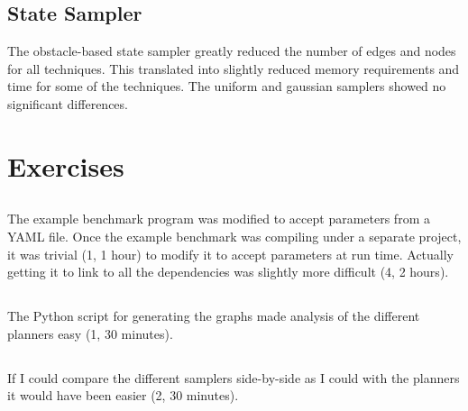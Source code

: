 \documentclass[twocolumn]{article}
\begin{document}
\subsection{State Sampler}

The obstacle-based state sampler greatly reduced the number of edges and nodes for all techniques. This translated into slightly reduced memory requirements and time for some of the techniques. The uniform and gaussian samplers showed no significant differences.


\section{Exercises}

\subsection{}

The example benchmark program was modified to accept parameters from a YAML file.
Once the example benchmark was compiling under a separate project, it was trivial (1, 1 hour) to modify it to accept parameters at run time. Actually getting it to link to all the dependencies was slightly more difficult (4, 2 hours).

\subsection {}

The Python script for generating the graphs made analysis of the different planners easy (1, 30 minutes).

\subsection {}

If I could compare the different samplers side-by-side as I could with the planners it would have been easier (2, 30 minutes).
\end{document}
